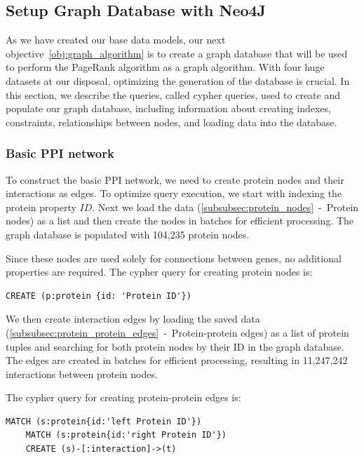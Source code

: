 \subsection{Setup Graph Database with Neo4J} \label{subsec:graph_database}

As we have created our base data models, our next objective~\ref{obj:graph_algorithm} is to create a graph database
that will be used to perform the PageRank algorithm as a graph algorithm.
With four huge datasets at our disposal, optimizing the generation of the database is crucial.
In this section, we describe the queries, called cypher queries, used to create and populate our graph database,
including information about creating indexes, constraints, relationships between nodes, and loading data into the database.\\


\subsubsection*{Basic PPI network} \label{subsubsec:basic_ppi_network}
To construct the basic PPI network, we need to create protein nodes and their interactions as edges.
To optimize query execution, we start with indexing the protein property $ID$.
Next we load the data (\cref{subsubsec:protein_nodes}~-~Protein nodes) as a list and then create the nodes in batches for efficient processing.
The graph database is populated with 104,235 protein nodes.

Since these nodes are used solely for connections between genes, no additional properties are required.
The cypher query for creating protein nodes is:
\begin{lstlisting}[language=Cypher, label={lst:protein_nodes}]
    CREATE (p:protein {id: 'Protein ID'})
\end{lstlisting}
\vspace{\baselineskip}

We then create interaction edges by loading the saved data (\cref{subsubsec:protein_protein_edges}~-~Protein-protein edges)
as a list of protein tuples and searching for both protein nodes by their ID in the graph database.
The edges are created in batches for efficient processing, resulting in 11,247,242 interactions between protein nodes.

The cypher query for creating protein-protein edges is:
\begin{lstlisting}[language=Cypher, label={lst:protein_edges}]
    MATCH (s:protein{id:'left Protein ID'})
    MATCH (s:protein{id:'right Protein ID'})
    CREATE (s)-[:interaction]->(t)
\end{lstlisting}

